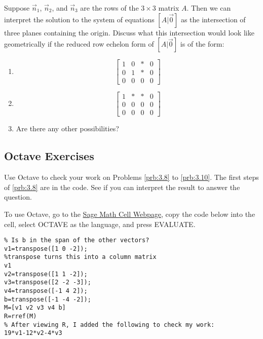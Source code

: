 \documentclass{ximera}
\begin{document}
\begin{problem}\label{prob:Anna3.2}
        Suppose $\vec{n}_1$, $\vec{n}_2$, and $\vec{n}_3$ are the rows of the $3 \times 3$ matrix $A$.  Then we can interpret the solution to the system of equations $[A|\vec{0}]$ as the intersection of three planes containing the origin.  Discuss what this intersection would look like geometrically if the reduced row echelon form of $[A|\vec{0}]$ is of the form:

\begin{enumerate}
\item
\begin{equation*}
\left[
\begin{array}{ccc|c}
1 & 0 & * & 0 \\
0 & 1 & * & 0 \\
0 & 0 & 0 & 0
\end{array}
\right]
\end{equation*}

\item
\begin{equation*}
\left[
\begin{array}{ccc|c}
1 & * & * & 0 \\
0 & 0 & 0 & 0 \\
0 & 0 & 0 & 0
\end{array}
\right]
\end{equation*}

\item  Are there any other possibilities?
            
\end{enumerate}
\end{problem}

\subsection*{Octave Exercises}
\begin{problem}\label{oct:lincomb}
Use Octave to check your work on Problems \ref{prb:3.8} to \ref{prb:3.10}.  The first steps of \ref{prb:3.8} are in the code.  See if you can interpret the result to answer the question.

To use Octave, go to the \href{https://sagecell.sagemath.org/}{Sage Math Cell Webpage}, copy the code below into the cell, select OCTAVE as the language, and press EVALUATE.

\begin{verbatim}
% Is b in the span of the other vectors?
v1=transpose([1 0 -2]);
%transpose turns this into a column matrix
v1
v2=transpose([1 1 -2]);
v3=transpose([2 -2 -3]);
v4=transpose([-1 4 2]);
b=transpose([-1 -4 -2]);
M=[v1 v2 v3 v4 b]
R=rref(M)
% After viewing R, I added the following to check my work: 
19*v1-12*v2-4*v3
\end{verbatim}
\end{problem}
\end{document}
